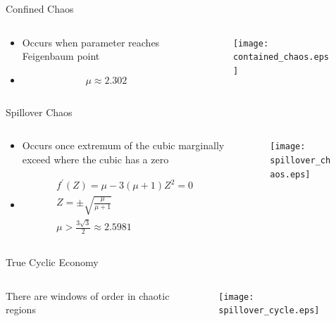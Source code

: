 \documentclass{beamer}
\begin{document}
\begin{frame}{Confined Chaos}
	\begin{columns}
		\begin{column}{0.5\textwidth}
			\begin{itemize}
				\item
					\centering
					Occurs when parameter reaches Feigenbaum point

				\item
					\begin{equation*}
						\mu\approx2.302
					\end{equation*}
			\end{itemize}
		\end{column}
		\begin{column}{0.5\textwidth}
			\begin{figure}
				\centering
				\texttt{[image: contained\_chaos.eps]}
			\end{figure}
		\end{column}
	\end{columns}
\end{frame}

\begin{frame}{Spillover Chaos}
	\begin{columns}
		\begin{column}{0.5\textwidth}
			\begin{itemize}
				\item
					\centering
					Occurs once extremum of the cubic marginally exceed where the cubic has a zero

				\item
					\begin{gather*}
						f^\prime(Z)=\mu-3(\mu+1)Z^2=0\\
						Z=\pm\sqrt{\frac{\mu}{\mu+1}}\\
						\mu>\frac{3\sqrt{3}}{2}\approx2.5981
					\end{gather*}
			\end{itemize}
		\end{column}

		\begin{column}{0.5\textwidth}
			\begin{figure}
				\centering
				\texttt{[image: spillover\_chaos.eps]}
			\end{figure}
		\end{column}
	\end{columns}
\end{frame}

\begin{frame}{True Cyclic Economy}
	\begin{columns}
		\begin{column}{0.5\textwidth}
				There are windows of order in chaotic regions
		\end{column}
		\begin{column}{0.5\textwidth}
			\begin{figure}
				\centering
				\texttt{[image: spillover\_cycle.eps]}
			\end{figure}
		\end{column}
	\end{columns}
\end{frame}
\end{document}
